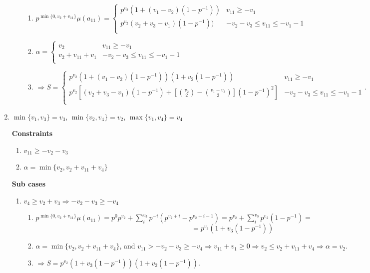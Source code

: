 \documentclass{article}
\begin{document}
\begin{enumerate}
\begin{enumerate}
        \begin{enumerate}
            \item $p^{\min\{0,v_2+v_{11}\}}\mu(a_{11})=
            \left\{
	\begin{array}{ll}
            p^{v_2}(1+(v_1-v_2)(1-p^{-1})) & v_{11}\geq{-v_1} \\
		  p^{v_2}(v_2+v_3-v_1)(1-p^{-1})) & -v_2-v_3\leq{v_{11}}\leq{-v_1-1} \\
	\end{array}
\right.
$
            \item $\alpha=\left\{
	\begin{array}{ll}
            v_2  & v_{11}\geq{-v_1} \\
		  v_2+v_{11}+v_1 & -v_2-v_3\leq{v_{11}}\leq{-v_1-1} \\
	\end{array}
\right.$
        \item $\Rightarrow{S=\left\{
	\begin{array}{ll}
            p^{v_2}(1+(v_1-v_2)(1-p^{-1}))(1+v_2(1-p^{-1}))  & v_{11}\geq{-v_1} \\
		              p^{v_2}[(v_2+v_3-v_1)(1-p^{-1})+[\binom{v_2}{2}-\binom{v_1-v_3}{2}](1-p^{-1})^2]  & -v_2-v_3\leq{v_{11}}\leq{-v_1-1} \\
	\end{array}
\right.}.$
        \end{enumerate}

    \end{enumerate}
    \item $\min\{v_1,v_3\}=v_3$, $\min\{v_2,v_4\}=v_2$, $\max\{v_1,v_4\}=v_4$
    
    \textbf{Constraints}
    \begin{enumerate}
        \item $v_{11}\geq{-v_2-v_3}$
        \item $\alpha=\min\{v_2,v_2+v_{11}+v_4\}$
    \end{enumerate}
    
    \textbf{Sub cases}
    \begin{enumerate}
        \item $v_4\geq{v_2+v_3}\Rightarrow{-v_2-v_3\geq{-v_4}}$

        \begin{enumerate}
            \item $p^{\min\{0,v_2+v_{11}\}}\mu(a_{11})=p^{0}p^{v_2}+\sum_i^{v_3}p^{-i}(p^{v_2+i}-p^{v_2+i-1})=p^{v_2}+\sum_i^{v_3}p^{v_2}(1-p^{-1})=$\[=p^{v_2}(1+v_3(1-p^{-1}))\]
            \item $\alpha=\min\{v_2,v_2+v_{11}+v_4\}$, and $v_{11}>-v_2-v_3\geq{-v_4}\Rightarrow{v_{11}+v_1\geq{0}}\Rightarrow{v_2\leq{v_2+v_{11}+v_4}}\Rightarrow{\alpha=v_2}.$
            \item $\Rightarrow{S=p^{v_2}(1+v_3(1-p^{-1}))(1+v_2(1-p^{-1}))}.$
        \end{enumerate}


\end{enumerate}
\end{enumerate}
\end{document}

